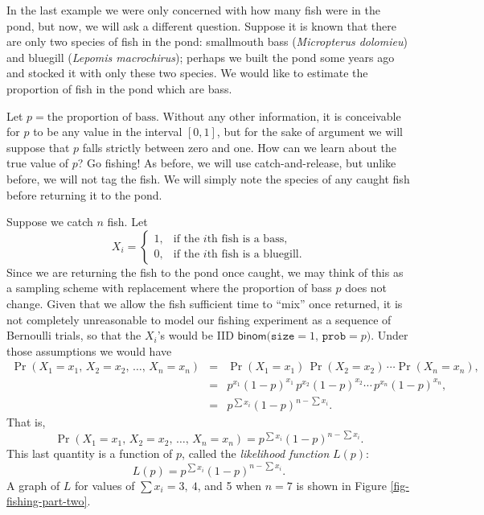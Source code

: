 \documentclass[captions=tableheading]{scrbook}
\begin{document}
\begin{example}
In the last example we were only concerned with how many fish were in the pond, but now, we will ask a different question. Suppose it is known that there are only two species of fish in the pond: smallmouth bass (\emph{Micropterus dolomieu}) and bluegill (\emph{Lepomis macrochirus}); perhaps we built the pond some years ago and stocked it with only these two species. We would like to estimate the proportion of fish in the pond which are bass.

Let \(p=\mbox{the proportion of bass}\). Without any other information, it is conceivable for \(p\) to be any value in the interval \([0,1]\), but for the sake of argument we will suppose that \(p\) falls strictly between zero and one. How can we learn about the true value of \(p\)? Go fishing! As before, we will use catch-and-release, but unlike before, we will not tag the fish. We will simply note the species of any caught fish before returning it to the pond. 

Suppose we catch \(n\) fish. Let
\[
X_{i}=
\begin{cases}
1, & \mbox{if the \(i\mathrm{th}\) fish is a bass,}\\
0, & \mbox{if the \(i\mathrm{th}\) fish is a bluegill.}
\end{cases}
\]
Since we are returning the fish to the pond once caught, we may think of this as a sampling scheme with replacement where the proportion of bass \(p\) does not change. Given that we allow the fish sufficient time to ``mix'' once returned, it is not completely unreasonable to model our fishing experiment as a sequence of Bernoulli trials, so that the \(X_{i}\)'s would be IID \(\mathsf{binom(\mathtt{size}}=1,\,\mathtt{prob}=p)\). Under those assumptions we would have
\begin{eqnarray*}
\Pr(X_{1}=x_{1},\, X_{2}=x_{2},\,\ldots,\, X_{n}=x_{n}) & = & \Pr(X_{1}=x_{1})\,\Pr(X_{2}=x_{2})\,\cdots\Pr(X_{n}=x_{n}),\\
 & = & p^{x_{1}}(1-p)^{x_{1}}\, p^{x_{2}}(1-p)^{x_{2}}\cdots\, p^{x_{n}}(1-p)^{x_{n}},\\
 & = & p^{\sum x_{i}}(1-p)^{n-\sum x_{i}}.
\end{eqnarray*}
That is, 
\[
\Pr(X_{1}=x_{1},\, X_{2}=x_{2},\,\ldots,\, X_{n}=x_{n})=p^{\sum x_{i}}(1-p)^{n-\sum x_{i}}.
\]
This last quantity is a function of \(p\), called the \emph{likelihood function} \(L(p)\):
\[
L(p)=p^{\sum x_{i}}(1-p)^{n-\sum x_{i}}.
\]
A graph of \(L\) for values of \(\sum x_{i}=3,\ 4\), and 5 when \(n=7\) is shown in Figure \ref{fig-fishing-part-two}. 



\end{example}
\end{document}

